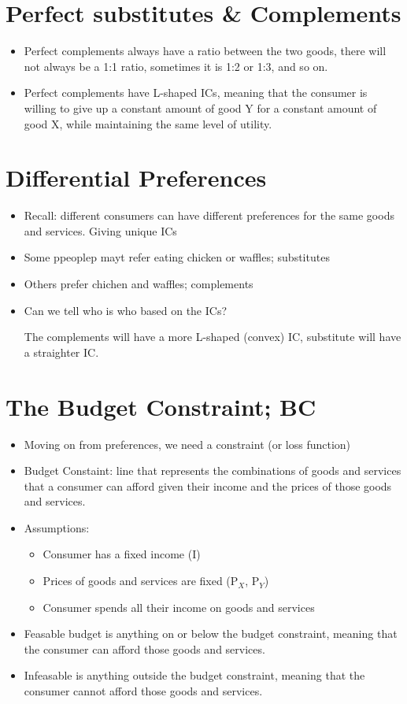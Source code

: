 \documentclass{article}
\begin{document}
\section*{Perfect substitutes \& Complements}
\begin{itemize}
  \item Perfect complements always have a ratio between the two goods,
    there will not always be a 1:1 ratio, sometimes it is 1:2 or 1:3, and so on.
  \item Perfect complements have L-shaped ICs,
    meaning that the consumer is willing to give up a constant amount of good Y
    for a constant amount of good X, while maintaining the same level of utility.
\end{itemize}

\section*{Differential Preferences}
\begin{itemize}
  \item Recall: different consumers can have different preferences
    for the same goods and services. Giving unique ICs
  \item Some ppeoplep mayt refer eating chicken or waffles; substitutes
  \item Others prefer chichen and waffles; complements
  \item Can we tell who is who based on the ICs?

    The complements will have a more L-shaped (convex) IC, substitute
    will have a straighter IC.
\end{itemize}

\section*{The Budget Constraint; BC}
\begin{itemize}
  \item Moving on from preferences, we need a constraint (or loss function)
  \item Budget Constaint: line that represents the combinations of goods and services
    that a consumer can afford given their income and the prices of those goods and services.
  \item Assumptions:
    \begin{itemize}
      \item Consumer has a fixed income (I)
      \item Prices of goods and services are fixed (P$_X$, P$_Y$)
      \item Consumer spends all their income on goods and services
    \end{itemize}
  \item Feasable budget is anything on or below the budget constraint,
    meaning that the consumer can afford those goods and services.
  \item Infeasable is anything outside the budget constraint,
    meaning that the consumer cannot afford those goods and services.
\end{itemize}
\end{document}
